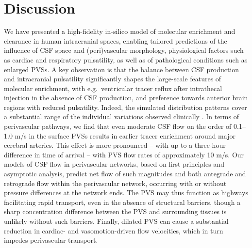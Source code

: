 \documentclass[fleqn,10pt]{wlscirep}
\begin{document}





\section*{Discussion}


We have presented a high-fidelity in-silico model of molecular
enrichment and clearance in human intracranial spaces, enabling
tailored predictions of the influence of CSF space and (peri)vascular
morphology, physiological factors such as cardiac and respiratory
pulsatility, as well as of pathological conditions such as enlarged
PVSs. A key observation is that the balance between CSF production and
intracranial pulsatility significantly shapes the large-scale features
of molecular enrichment, with e.g.~ventricular tracer reflux after
intrathecal injection in the absence of CSF production, and preference
towards anterior brain regions with reduced pulsatility. Indeed, the
simulated distribution patterns cover a substantial range of the
individual variations observed clinically \cite{ringstad2018brain}. In
terms of perivascular pathways, we find that even moderate CSF flow on
the order of 0.1--1.0 \textmu m/s in the surface PVSs results in
earlier tracer enrichment around major cerebral arteries. This effect
is more pronounced -- with up to a three-hour difference in time of
arrival -- with PVS flow rates of approximately 10 \textmu m/s. Our
models of CSF flow in perivascular networks, based on first principles
and asymptotic analysis, predict net flow of such magnitudes and both
antegrade and retrograde flow within the perivascular network,
occurring with or without pressure differences at the network
ends. The PVS may thus function as highways facilitating rapid
transport, even in the absence of structural barriers, though a sharp
concentration difference between the PVS and surrounding tissues is
unlikely without such barriers. Finally, dilated PVS can cause a
substantial reduction in cardiac- and vasomotion-driven flow
velocities, which in turn impedes perivascular transport.
\end{document}
